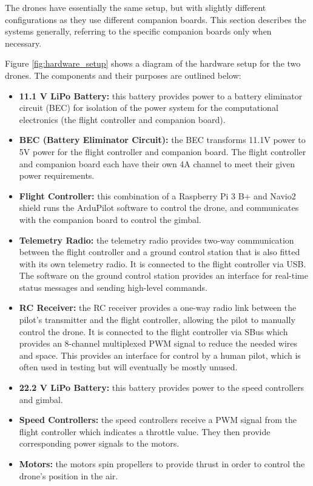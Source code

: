 The drones have essentially the same setup, but with slightly different configurations as they use different companion boards. This section describes the systems generally, referring to the specific companion boards only when necessary.

Figure \ref{fig:hardware_setup} shows a diagram of the hardware setup for the two drones. The components and their purposes are outlined below:
\begin{itemize}
    \item \textbf{11.1 V LiPo Battery:} this battery provides power to a battery eliminator circuit (BEC) for isolation of the power system for the computational electronics (the flight controller and companion board).
    \item \textbf{BEC (Battery Eliminator Circuit):} the BEC transforms 11.1V power to 5V power for the flight controller and companion board. The flight controller and companion board each have their own 4A channel to meet their given power requirements.
    \item \textbf{Flight Controller:} this combination of a Raspberry Pi 3 B+ and Navio2 shield runs the ArduPilot software to control the drone, and communicates with the companion board to control the gimbal.
    \item \textbf{Telemetry Radio:} the telemetry radio provides two-way communication between the flight controller and a ground control station that is also fitted with its own telemetry radio. It is connected to the flight controller via USB. The software on the ground control station provides an interface for real-time status messages and sending high-level commands.
    \item \textbf{RC Receiver:} the RC receiver provides a one-way radio link between the pilot's transmitter and the flight controller, allowing the pilot to manually control the drone. It is connected to the flight controller via SBus which provides an 8-channel multiplexed PWM signal to reduce the needed wires and space. This provides an interface for control by a human pilot, which is often used in testing but will eventually be mostly unused.
    \item \textbf{22.2 V LiPo Battery:} this battery provides power to the speed controllers and gimbal.
    \item \textbf{Speed Controllers:} the speed controllers receive a PWM signal from the flight controller which indicates a throttle value. They then provide corresponding power signals to the motors.
    \item \textbf{Motors:} the motors spin propellers to provide thrust in order to control the drone's position in the air.

\end{itemize}
